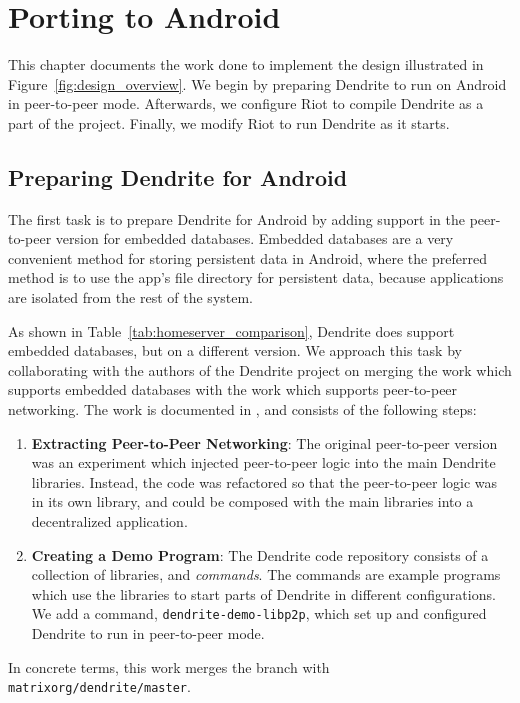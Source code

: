 \chapter{Porting to Android}\label{chp:implementation}
This chapter documents the work done to implement the design illustrated in Figure~\ref{fig:design_overview}.
We begin by preparing Dendrite to run on Android in peer-to-peer mode.
Afterwards, we configure Riot to compile Dendrite as a part of the project.
Finally, we modify Riot to run Dendrite as it starts.

\section{Preparing Dendrite for Android}\label{sec:preparing_dendrite}
The first task is to prepare Dendrite for Android by adding support in the peer-to-peer version for embedded databases.
Embedded databases are a very convenient method for storing persistent data in Android, where the preferred method is to use the app's file directory for persistent data\cite{android_devdocs_data_storage, android_devdocs_internal_storage}, because applications are isolated from the rest of the system.

As shown in Table~\ref{tab:homeserver_comparison}, Dendrite does support embedded databases, but on a different version.
We approach this task by collaborating with the authors of the Dendrite project on merging the work which supports embedded databases with the work which supports peer-to-peer networking.
The work is documented in , and consists of the following steps:
\begin{enumerate}
	\item{
	      \textbf{Extracting Peer-to-Peer Networking}:
	      The original peer-to-peer version was an experiment which injected peer-to-peer logic into the main Dendrite libraries.
	      Instead, the code was refactored so that the peer-to-peer logic was in its own library, and could be composed with the main libraries into a decentralized application.
	      }
	\item{
	      \textbf{Creating a Demo Program}:
	      The Dendrite code repository consists of a collection of libraries, and \textit{commands}.
	      The commands are example programs which use the libraries to start parts of Dendrite in different configurations.
	      We add a command, \texttt{dendrite-demo-libp2p}, which set up and configured Dendrite to run in peer-to-peer mode.
	      }
\end{enumerate}
In concrete terms, this work merges the  branch with \texttt{matrix\-org/dendrite/master}.


